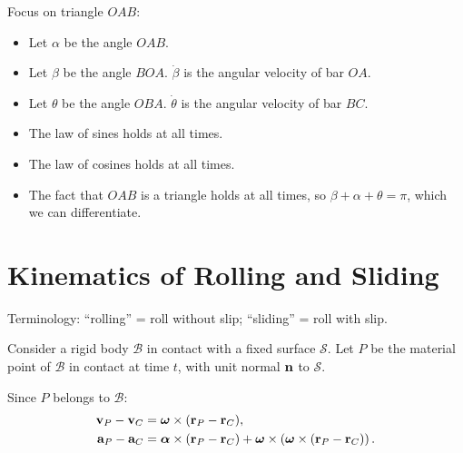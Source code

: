 \documentclass[
  letterpaper,
  DIV=11,
  numbers=noendperiod]{scrreprt}
\newcommand{\lp}{\left(}
\newcommand{\rp}{\right)}
\newcommand{\bomega}{\boldsymbol{\omega}}
\newcommand{\balpha}{\boldsymbol{\alpha}}
\begin{document}
Focus on triangle \(OAB\):

\begin{itemize}
\item
  Let \(\alpha\) be the angle \(OAB\).
\item
  Let \(\beta\) be the angle \(BOA\). \(\dot{\beta}\) is the angular
  velocity of bar \(OA\).
\item
  Let \(\theta\) be the angle \(OBA\). \(\dot{\theta}\) is the angular
  velocity of bar \(BC\).
\item
  The law of sines holds at all times.
\item
  The law of cosines holds at all times.
\item
  The fact that \(OAB\) is a triangle holds at all times, so
  \(\beta+\alpha+\theta=\pi\), which we can differentiate.
\end{itemize}

\section{Kinematics of Rolling and
Sliding}\label{kinematics-of-rolling-and-sliding}

\begin{tcolorbox}[enhanced jigsaw, arc=.35mm, bottomrule=.15mm, bottomtitle=1mm, breakable, colback=white, colbacktitle=quarto-callout-important-color!10!white, colframe=quarto-callout-important-color-frame, coltitle=black, left=2mm, leftrule=.75mm, opacityback=0, opacitybacktitle=0.6, rightrule=.15mm, title=\textcolor{quarto-callout-important-color}{\faExclamation}\hspace{0.5em}{Note!}, titlerule=0mm, toprule=.15mm, toptitle=1mm]

Terminology: ``rolling'' = roll without slip; ``sliding'' = roll with
slip.

\end{tcolorbox}

Consider a rigid body \(\mathcal{B}\) in contact with a fixed surface
\(\mathcal{S}\). Let \(P\) be the material point of \(\mathcal{B}\) in
contact at time \(t\), with unit normal \({\bf n}\) to \(\mathcal{S}\).

Since \(P\) belongs to \(\mathcal{B}\): \begin{align}
    {\bf v}_P-{\bf v}_C &= \bomega\times({\bf r}_P-{\bf r}_C),\\
    {\bf a}_P-{\bf a}_C &= \balpha\times({\bf r}_P-{\bf r}_C)+\bomega\times\lp\bomega\times({\bf r}_P-{\bf r}_C)\rp.
\end{align}
\end{document}
